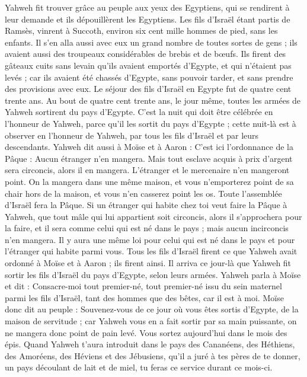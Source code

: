 \begin{multicols}{2}
Yahweh fit trouver grâce au peuple aux yeux des Egyptiens, qui se rendirent à leur demande et ils dépouillèrent les Egyptiens.
Les fils d'Israël étant partis de Ramsès, vinrent à Succoth, environ six cent mille hommes de pied, sans les enfants.
Il s'en alla aussi avec eux un grand nombre de toutes sortes de gens ; ils avaient aussi des troupeaux considérables de brebis et de bœufs.
Ils firent des gâteaux cuits sans levain qu’ils avaient emportés d’Egypte, et qui n’étaient pas levés ; car ils avaient été chassés d’Egypte, sans pouvoir tarder, et sans prendre des provisions avec eux.
Le séjour des fils d'Israël en Egypte fut de quatre cent trente ans\FTNT{}.
Au bout de quatre cent trente ans, le jour même, toutes les armées de Yahweh sortirent du pays d'Egypte.
C'est la nuit qui doit être célébrée en l'honneur de Yahweh, parce qu'il les sortit du pays d'Egypte ; cette nuit-là est à observer en l'honneur de Yahweh, par tous les fils d'Israël et par leurs descendants\FTNT{}.
Yahweh dit aussi à Moïse et à Aaron : C'est ici l'ordonnance de la Pâque : Aucun étranger n'en mangera.
Mais tout esclave acquis à prix d’argent sera circoncis, alors il en mangera.
L'étranger et le mercenaire n'en mangeront point.
On la mangera dans une même maison, et vous n'emporterez point de sa chair hors de la maison, et vous n'en casserez point les os.
Toute l'assemblée d'Israël fera la Pâque.
Si un étranger qui habite chez toi veut faire la Pâque à Yahweh, que tout mâle qui lui appartient soit circoncis, alors il s'approchera pour la faire, et il sera comme celui qui est né dans le pays ; mais aucun incirconcis n'en mangera.
Il y aura une même loi pour celui qui est né dans le pays et pour l'étranger qui habite parmi vous.
Tous les fils d'Israël firent ce que Yahweh avait ordonné à Moïse et à Aaron ; ils firent ainsi.
Il arriva ce jour-là que Yahweh fit sortir les fils d'Israël du pays d'Egypte, selon leurs armées.
\VerseOne{}Yahweh parla à Moïse et dit :
Consacre-moi tout premier-né, tout premier-né issu du sein maternel parmi les fils d'Israël, tant des hommes que des bêtes, car il est à moi\FTNT{}.
Moïse donc dit au peuple : Souvenez-vous de ce jour où vous êtes sortis d'Egypte, de la maison de servitude ; car Yahweh vous en a fait sortir par sa main puissante, on ne mangera donc point de pain levé.
Vous sortez aujourd'hui dans le mois des épis.
Quand Yahweh t'aura introduit dans le pays des Cananéens, des Héthiens, des Amoréens, des Héviens et des Jébusiens, qu’il a juré à tes pères de te donner, un pays découlant de lait et de miel, tu feras ce service durant ce mois-ci.

\end{multicols}
